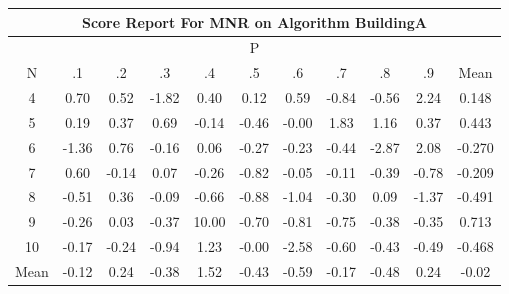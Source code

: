 \documentclass[11pt,a4paper]{report}
\begin{document}
\begin{longtable}{ | c || c | c | c | c | c | c | c | c | c || c |}
\hline
\multicolumn{11}{|c|}{ Score Report For MNR on Algorithm BuildingA} \\
\hline
\multicolumn{11}{|c|}{ P } \\
\hline
N & .1 & .2 & .3 & .4 & .5 & .6 & .7 & .8 & .9 & Mean\\
 \hline
 \hline
 \endhead
  4 &  \cellcolor[HTML]{EFEFFF} 0.70 &  \cellcolor[HTML]{EFEFFF} 0.52 &  \cellcolor[HTML]{FFCFCF} -1.82 &  \cellcolor[HTML]{F7F7FF} 0.40 &  \cellcolor[HTML]{FFFFFF} 0.12 &  \cellcolor[HTML]{EFEFFF} 0.59 &  \cellcolor[HTML]{FFE7E7} -0.84 &  \cellcolor[HTML]{FFEFEF} -0.56 &  \cellcolor[HTML]{C7C7FF} 2.24 & 0.148 \\
  5 &  \cellcolor[HTML]{F7F7FF} 0.19 &  \cellcolor[HTML]{F7F7FF} 0.37 &  \cellcolor[HTML]{EFEFFF} 0.69 &  \cellcolor[HTML]{FFFFFF} -0.14 &  \cellcolor[HTML]{FFF7F7} -0.46 &  \cellcolor[HTML]{FFFFFF} -0.00 &  \cellcolor[HTML]{CFCFFF} 1.83 &  \cellcolor[HTML]{DFDFFF} 1.16 &  \cellcolor[HTML]{F7F7FF} 0.37 & 0.443 \\
  6 &  \cellcolor[HTML]{FFDFDF} -1.36 &  \cellcolor[HTML]{EFEFFF} 0.76 &  \cellcolor[HTML]{FFF7F7} -0.16 &  \cellcolor[HTML]{FFFFFF} 0.06 &  \cellcolor[HTML]{FFF7F7} -0.27 &  \cellcolor[HTML]{FFF7F7} -0.23 &  \cellcolor[HTML]{FFF7F7} -0.44 &  \cellcolor[HTML]{FFB7B7} -2.87 &  \cellcolor[HTML]{C7C7FF} 2.08 & -0.270 \\
  7 &  \cellcolor[HTML]{EFEFFF} 0.60 &  \cellcolor[HTML]{FFFFFF} -0.14 &  \cellcolor[HTML]{FFFFFF} 0.07 &  \cellcolor[HTML]{FFF7F7} -0.26 &  \cellcolor[HTML]{FFE7E7} -0.82 &  \cellcolor[HTML]{FFFFFF} -0.05 &  \cellcolor[HTML]{FFFFFF} -0.11 &  \cellcolor[HTML]{FFF7F7} -0.39 &  \cellcolor[HTML]{FFEFEF} -0.78 & -0.209 \\
  8 &  \cellcolor[HTML]{FFEFEF} -0.51 &  \cellcolor[HTML]{F7F7FF} 0.36 &  \cellcolor[HTML]{FFFFFF} -0.09 &  \cellcolor[HTML]{FFEFEF} -0.66 &  \cellcolor[HTML]{FFE7E7} -0.88 &  \cellcolor[HTML]{FFE7E7} -1.04 &  \cellcolor[HTML]{FFF7F7} -0.30 &  \cellcolor[HTML]{FFFFFF} 0.09 &  \cellcolor[HTML]{FFDFDF} -1.37 & -0.491 \\
  9 &  \cellcolor[HTML]{FFF7F7} -0.26 &  \cellcolor[HTML]{FFFFFF} 0.03 &  \cellcolor[HTML]{FFF7F7} -0.37 &  \cellcolor[HTML]{0808FF} 10.00 &  \cellcolor[HTML]{FFEFEF} -0.70 &  \cellcolor[HTML]{FFE7E7} -0.81 &  \cellcolor[HTML]{FFEFEF} -0.75 &  \cellcolor[HTML]{FFF7F7} -0.38 &  \cellcolor[HTML]{FFF7F7} -0.35 & 0.713 \\
  10 &  \cellcolor[HTML]{FFF7F7} -0.17 &  \cellcolor[HTML]{FFF7F7} -0.24 &  \cellcolor[HTML]{FFE7E7} -0.94 &  \cellcolor[HTML]{DFDFFF} 1.23 &  \cellcolor[HTML]{FFFFFF} -0.00 &  \cellcolor[HTML]{FFBFBF} -2.58 &  \cellcolor[HTML]{FFEFEF} -0.60 &  \cellcolor[HTML]{FFF7F7} -0.43 &  \cellcolor[HTML]{FFEFEF} -0.49 & -0.468 \\
 \hline
 \hline
Mean &  \cellcolor[HTML]{FFFFFF} -0.12 &  \cellcolor[HTML]{F7F7FF} 0.24 &  \cellcolor[HTML]{FFF7F7} -0.38 &  \cellcolor[HTML]{D7D7FF} 1.52 &  \cellcolor[HTML]{FFF7F7} -0.43 &  \cellcolor[HTML]{FFEFEF} -0.59 &  \cellcolor[HTML]{FFF7F7} -0.17 &  \cellcolor[HTML]{FFEFEF} -0.48 &  \cellcolor[HTML]{F7F7FF} 0.24 &  \cellcolor[HTML]{FFFFFF} -0.02
\end{longtable}
\end{document}
